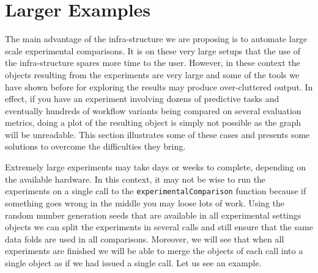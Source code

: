 \documentclass[10pt,a4paper]{article}\usepackage[]{graphicx}\usepackage[]{color}
\begin{document}
\section{Larger Examples}

The main advantage of the infra-structure we are proposing is to
automate large scale experimental comparisons. It is on these very
large setups that the use of the infra-structure spares more time to
the user. However, in these context the objects resulting from the
experiments are very large and some of the tools we have shown before
for exploring the results may produce over-cluttered output. In
effect, if you have an experiment involving dozens of predictive tasks
and eventually hundreds of workflow variants being compared on several
evaluation metrics, doing a plot of the resulting object is simply not
possible as the graph will be unreadable. This section illustrates
some of these cases and presents some solutions to overcome the
difficulties they bring.

Extremely large experiments may take days or weeks to complete,
depending on the available hardware. In this context, it may not be
wise to run the experiments on a single call to the
\texttt{experimentalComparison} function because if something goes
wrong in the middle you may loose lots of work. Using the random
number generation seeds that are available in all experimental
settings objects we can split the experiments in several calls and
still ensure that the same data folds are used in all
comparisons. Moreover, we will see that when all experiments are
finished we will be able to merge the objects of each call into a
single object as if we had issued a single call. Let us see an
example.
\end{document}
